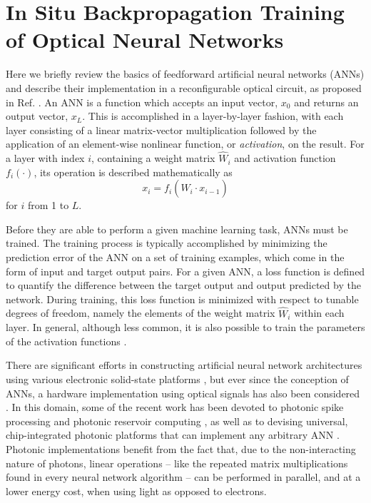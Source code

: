 \section{In Situ Backpropagation Training of Optical Neural Networks}

Here we briefly review the basics of feedforward artificial neural networks (ANNs) and describe their implementation in a reconfigurable optical circuit, as proposed in Ref. .
An ANN is a function which accepts an input vector, $x_0$ and returns an output vector, $x_L$.  
This is accomplished in a layer-by-layer fashion, with each layer consisting of a linear matrix-vector multiplication followed by the application of an element-wise nonlinear function, or \textit{activation}, on the result.  
For a layer with index $i$, containing a weight matrix $\hat{W}_i$ and activation function $f_i(\cdot)$, its operation is described mathematically as
\begin{equation}
   x_i = f_i{\left( \hat{W}_i \cdot x_{i-1} \right)}
\end{equation}
for $i$ from 1 to $L$.

Before they are able to perform a given machine learning task, ANNs must be trained. 
The training process is typically accomplished by minimizing the prediction error of the ANN on a set of training examples, which come in the form of input and target output pairs. 
For a given ANN, a loss function is defined to quantify the difference between the target output and output predicted by the network.  
During training, this loss function is minimized with respect to tunable degrees of freedom, namely the elements of the weight matrix $\hat{W}_i$ within each layer. 
In general, although less common, it is also possible to train the parameters of the activation functions \cite{trentin_networks_2001}.

There are significant efforts in constructing artificial neural network architectures using various electronic solid-state platforms \cite{Merolla2014,Prezioso2015}, but ever since the conception of ANNs, a hardware implementation using optical signals has also been considered \cite{Abu-Mostafa1987, Jutamulia1996}. In this domain, some of the recent work has been devoted to photonic spike processing \cite{Rosenbluth2009, Tait2014} and photonic reservoir computing \cite{Brunner2013, Vandoorne2014}, as well as to devising universal, chip-integrated photonic platforms that can implement any arbitrary ANN \cite{Shainline2017, Shen2017}.  Photonic implementations benefit from the fact that, due to the non-interacting nature of photons, linear operations -- like the repeated matrix multiplications found in every neural network algorithm -- can be performed in parallel, and at a lower energy cost, when using light as opposed to electrons. 


